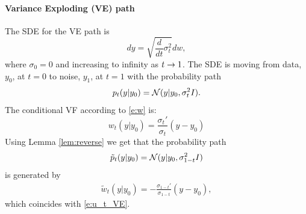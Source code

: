 \documentclass{article}
\begin{document}
\paragraph{Variance Exploding (VE) path}
The SDE for the VE path is 
\begin{equation*}
 dy = \sqrt{\frac{d}{dt}\sigma_t^2}dw,
\end{equation*}
where $\sigma_0=0$ and increasing to infinity as $t\rightarrow 1$.
The SDE is moving from data, $y_0$, at $t=0$ to noise, $y_1$, at $t=1$ with the probability path
\begin{equation*}
    p_t(y|y_0) = {\mathcal{N}}(y | y_0, \sigma^2_t I).
\end{equation*}
The conditional VF according to \eqref{e:w} is:
\begin{equation*}
    w_t(y|y_0) = \frac{ \sigma_t'}{\sigma_t}(y-y_0)
\end{equation*}
Using Lemma \ref{lem:reverse} we get that the probability path 
\begin{equation*}
    \tilde{p}_t(y|y_0) = {\mathcal{N}}(y|y_0, \sigma_{1-t}^2 I)
\end{equation*}
is generated by 
\begin{align*}
    \tilde{w}_t(y|y_0) =-\frac{ \sigma_{1-t}'}{\sigma_{1-t}}(y-y_0),
\end{align*}
which coincides with \eqref{e:u_t_VE}.
\end{document}
